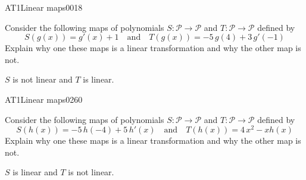 \begin{exercise}{AT1}{Linear maps}{0018} 
\begin{exerciseStatement} 

 Consider the following maps of polynomials \(S:\mathcal{P}\rightarrow\mathcal{P}\) and \(T:\mathcal{P}\rightarrow\mathcal{P}\) defined by \[
            S(g(x))=
                    g'\left(x\right) + 1
                \hspace{1em} \text{and} \hspace{1em}
            T(g(x))=
                    -5 \, g\left(4\right) + 3 \, g'\left(-1\right)
        \] Explain why one these maps is a linear transformation and why the other map is not. 

 \end{exerciseStatement}
 \begin{exerciseAnswer} 

\(S\) is not linear and \(T\) is linear.

 \end{exerciseAnswer}
 \end{exercise}



\begin{exercise}{AT1}{Linear maps}{0260} 
\begin{exerciseStatement} 

 Consider the following maps of polynomials \(S:\mathcal{P}\rightarrow\mathcal{P}\) and \(T:\mathcal{P}\rightarrow\mathcal{P}\) defined by \[
            S(h(x))=
                    -5 \, h\left(-4\right) + 5 \, h'\left(x\right)
                \hspace{1em} \text{and} \hspace{1em}
            T(h(x))=
                    4 \, x^{2} - x h\left(x\right)
        \] Explain why one these maps is a linear transformation and why the other map is not. 

 \end{exerciseStatement}
 \begin{exerciseAnswer} 

\(S\) is linear and \(T\) is not linear.

 \end{exerciseAnswer}
 \end{exercise}


\newpage




